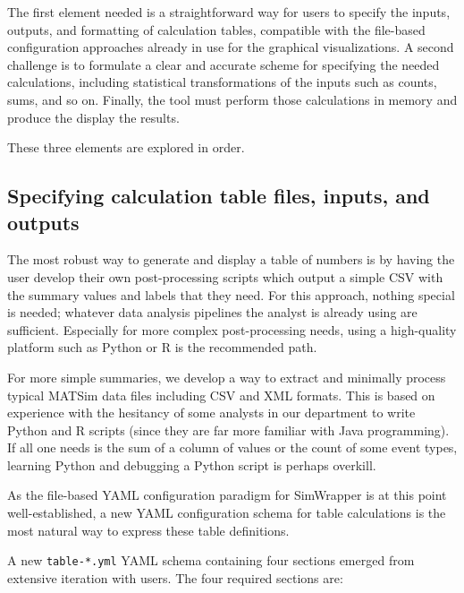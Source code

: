 \documentclass[3p,times,procedia]{elsarticle}
\begin{document}
The first element needed is a straightforward way for users to specify the inputs, outputs, and formatting of calculation tables, compatible with the file-based configuration approaches already in use for the graphical visualizations. A second challenge is to formulate a clear and accurate scheme for specifying the needed calculations, including statistical transformations of the inputs such as counts, sums, and so on. Finally, the tool must perform those calculations in memory and produce the display the results.

These three elements are explored in order.


\subsection{Specifying calculation table files, inputs, and outputs}

The most robust way to generate and display a table of numbers is by having the user develop their own post-processing scripts which output a simple CSV with the summary values and labels that they need. For this approach, nothing special is needed; whatever data analysis pipelines the analyst is already using are sufficient. Especially for more complex post-processing needs, using a high-quality platform such as Python or R is the recommended path.

For more simple summaries, we develop a way to extract and minimally process typical MATSim data files including CSV and XML formats. This is based on experience with the hesitancy of some analysts in our department to write Python and R scripts (since they are far more familiar with Java programming). If all one needs is the sum of a column of values or the count of some event types, learning Python and debugging a Python script is perhaps overkill.

As the file-based YAML configuration paradigm for SimWrapper is at this point well-established, a new YAML configuration schema for table calculations is the most natural way to express these table definitions.

A new \texttt{table-*.yml} YAML schema containing four sections emerged from extensive iteration with users. The four required sections are:
\end{document}
